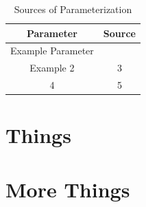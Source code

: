 \documentclass[double,12pt]{beavtex}
\begin{document}
\pagebreak



\pagebreak

\appendix

\begin{table}[ht]
\centering
\caption{Sources of Parameterization}
\begin{tabular}[t]{cc}
\toprule
Parameter&Source\\
\midrule
Example Parameter& \cite{bockheimNutrientDynamicsDecomposing2011}\\
Example 2&3\\
4&5\\
\bottomrule
\end{tabular}
\end{table}%

\chapter{Things}





\chapter{More Things}
\end{document}
